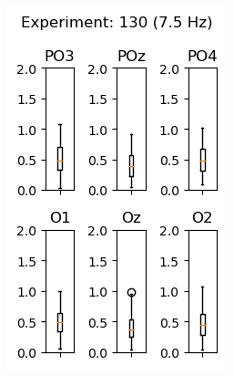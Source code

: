 \begin{figure}[ht]
\begin{subfigure}{0.25\linewidth}
        \includegraphics[width=\linewidth]{images/appendix/13075.png}
        \label{fig:13075}
    \end{subfigure}
    

\end{figure}
